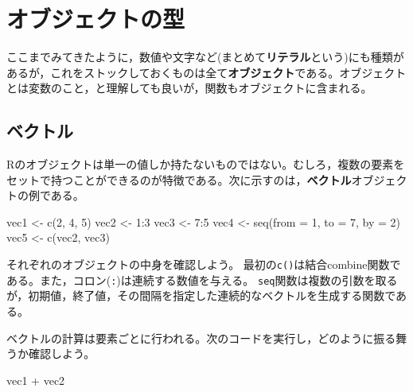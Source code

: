 \documentclass[
  a4paper,
]{ltjsbook}
\newenvironment{Shaded}{\begin{snugshade}}{\end{snugshade}}
\newcommand{\AttributeTok}[1]{\textcolor[rgb]{0.40,0.45,0.13}{#1}}
\newcommand{\DecValTok}[1]{\textcolor[rgb]{0.68,0.00,0.00}{#1}}
\newcommand{\FunctionTok}[1]{\textcolor[rgb]{0.28,0.35,0.67}{#1}}
\newcommand{\NormalTok}[1]{\textcolor[rgb]{0.00,0.23,0.31}{#1}}
\newcommand{\OtherTok}[1]{\textcolor[rgb]{0.00,0.23,0.31}{#1}}
\newcommand{\SpecialCharTok}[1]{\textcolor[rgb]{0.37,0.37,0.37}{#1}}
\begin{document}
\section{オブジェクトの型}\label{ux30aaux30d6ux30b8ux30a7ux30afux30c8ux306eux578b}

ここまでみてきたように，数値や文字など(まとめて\textbf{リテラル}という)にも種類があるが，これをストックしておくものは全て\textbf{オブジェクト}である。オブジェクトとは変数のこと，と理解しても良いが，関数もオブジェクトに含まれる。

\subsection{ベクトル}\label{ux30d9ux30afux30c8ux30eb}

Rのオブジェクトは単一の値しか持たないものではない。むしろ，複数の要素をセットで持つことができるのが特徴である。次に示すのは，\textbf{ベクトル}オブジェクトの例である。

\begin{Shaded}
\begin{Highlighting}[]
\NormalTok{vec1 }\OtherTok{\textless{}{-}} \FunctionTok{c}\NormalTok{(}\DecValTok{2}\NormalTok{, }\DecValTok{4}\NormalTok{, }\DecValTok{5}\NormalTok{)}
\NormalTok{vec2 }\OtherTok{\textless{}{-}} \DecValTok{1}\SpecialCharTok{:}\DecValTok{3}
\NormalTok{vec3 }\OtherTok{\textless{}{-}} \DecValTok{7}\SpecialCharTok{:}\DecValTok{5}
\NormalTok{vec4 }\OtherTok{\textless{}{-}} \FunctionTok{seq}\NormalTok{(}\AttributeTok{from =} \DecValTok{1}\NormalTok{, }\AttributeTok{to =} \DecValTok{7}\NormalTok{, }\AttributeTok{by =} \DecValTok{2}\NormalTok{)}
\NormalTok{vec5 }\OtherTok{\textless{}{-}} \FunctionTok{c}\NormalTok{(vec2, vec3)}
\end{Highlighting}
\end{Shaded}

それぞれのオブジェクトの中身を確認しよう。
最初の\texttt{c()}は結合combine関数である。また，コロン(\texttt{:})は連続する数値を与える。
\texttt{seq}関数は複数の引数を取るが，初期値，終了値，その間隔を指定した連続的なベクトルを生成する関数である。

ベクトルの計算は要素ごとに行われる。次のコードを実行し，どのように振る舞うか確認しよう。

\begin{Shaded}
\begin{Highlighting}[]
\NormalTok{vec1 }\SpecialCharTok{+}\NormalTok{ vec2}
\end{Highlighting}
\end{Shaded}
\end{document}
